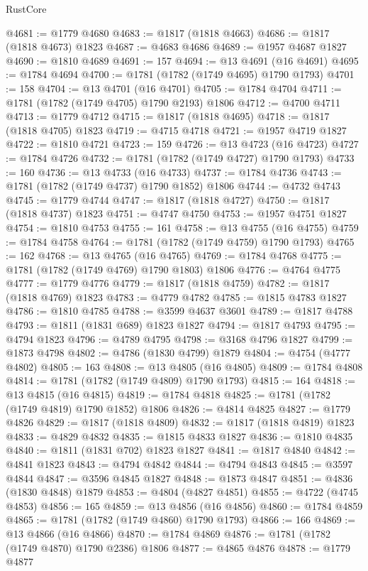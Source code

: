 \begin{lexlean}{RustCore}
\begin{coremodule}
@4681 := @1779 @4680
@4683 := @1817 (@1818 @4663)
@4686 := @1817 (@1818 @4673) @1823
@4687 := @4683 @4686
@4689 := @1957 @4687 @1827
@4690 := @1810 @4689
@4691 := 157
@4694 := @13 @4691 (@16 @4691)
@4695 := @1784 @4694
@4700 := @1781 (@1782 (@1749 @4695) @1790 @1793)
@4701 := 158
@4704 := @13 @4701 (@16 @4701)
@4705 := @1784 @4704
@4711 := @1781 (@1782 (@1749 @4705) @1790 @2193) @1806
@4712 := @4700 @4711
@4713 := @1779 @4712
@4715 := @1817 (@1818 @4695)
@4718 := @1817 (@1818 @4705) @1823
@4719 := @4715 @4718
@4721 := @1957 @4719 @1827
@4722 := @1810 @4721
@4723 := 159
@4726 := @13 @4723 (@16 @4723)
@4727 := @1784 @4726
@4732 := @1781 (@1782 (@1749 @4727) @1790 @1793)
@4733 := 160
@4736 := @13 @4733 (@16 @4733)
@4737 := @1784 @4736
@4743 := @1781 (@1782 (@1749 @4737) @1790 @1852) @1806
@4744 := @4732 @4743
@4745 := @1779 @4744
@4747 := @1817 (@1818 @4727)
@4750 := @1817 (@1818 @4737) @1823
@4751 := @4747 @4750
@4753 := @1957 @4751 @1827
@4754 := @1810 @4753
@4755 := 161
@4758 := @13 @4755 (@16 @4755)
@4759 := @1784 @4758
@4764 := @1781 (@1782 (@1749 @4759) @1790 @1793)
@4765 := 162
@4768 := @13 @4765 (@16 @4765)
@4769 := @1784 @4768
@4775 := @1781 (@1782 (@1749 @4769) @1790 @1803) @1806
@4776 := @4764 @4775
@4777 := @1779 @4776
@4779 := @1817 (@1818 @4759)
@4782 := @1817 (@1818 @4769) @1823
@4783 := @4779 @4782
@4785 := @1815 @4783 @1827
@4786 := @1810 @4785
@4788 := @3599 @4637 @3601
@4789 := @1817 @4788
@4793 := @1811 (@1831 @689) @1823 @1827
@4794 := @1817 @4793
@4795 := @4794 @1823
@4796 := @4789 @4795
@4798 := @3168 @4796 @1827
@4799 := @1873 @4798
@4802 := @4786 (@1830 @4799) @1879
@4804 := @4754 (@4777 @4802)
@4805 := 163
@4808 := @13 @4805 (@16 @4805)
@4809 := @1784 @4808
@4814 := @1781 (@1782 (@1749 @4809) @1790 @1793)
@4815 := 164
@4818 := @13 @4815 (@16 @4815)
@4819 := @1784 @4818
@4825 := @1781 (@1782 (@1749 @4819) @1790 @1852) @1806
@4826 := @4814 @4825
@4827 := @1779 @4826
@4829 := @1817 (@1818 @4809)
@4832 := @1817 (@1818 @4819) @1823
@4833 := @4829 @4832
@4835 := @1815 @4833 @1827
@4836 := @1810 @4835
@4840 := @1811 (@1831 @702) @1823 @1827
@4841 := @1817 @4840
@4842 := @4841 @1823
@4843 := @4794 @4842
@4844 := @4794 @4843
@4845 := @3597 @4844
@4847 := @3596 @4845 @1827
@4848 := @1873 @4847
@4851 := @4836 (@1830 @4848) @1879
@4853 := @4804 (@4827 @4851)
@4855 := @4722 (@4745 @4853)
@4856 := 165
@4859 := @13 @4856 (@16 @4856)
@4860 := @1784 @4859
@4865 := @1781 (@1782 (@1749 @4860) @1790 @1793)
@4866 := 166
@4869 := @13 @4866 (@16 @4866)
@4870 := @1784 @4869
@4876 := @1781 (@1782 (@1749 @4870) @1790 @2386) @1806
@4877 := @4865 @4876
@4878 := @1779 @4877

\end{coremodule}
\end{lexlean}
